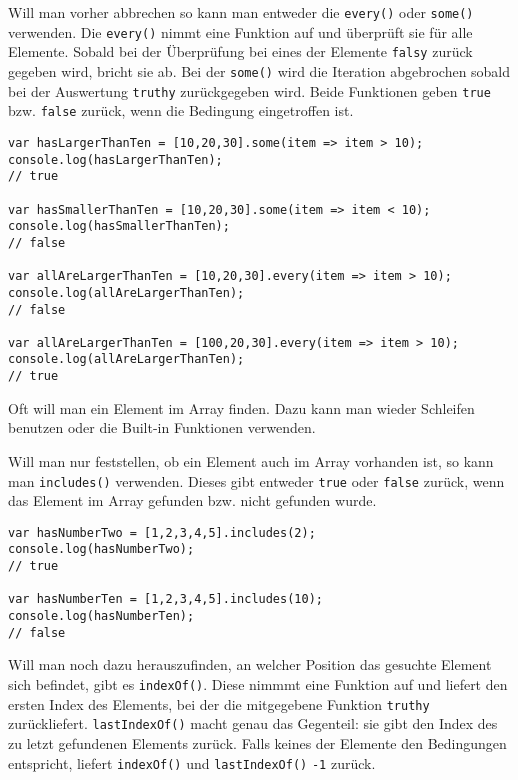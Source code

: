 \documentclass{book}
\begin{document}
Will man vorher abbrechen so kann man entweder die \lstinline|every()| oder \lstinline|some()| verwenden. Die \lstinline|every()| nimmt eine Funktion auf und überprüft sie für alle Elemente. Sobald bei der Überprüfung bei eines der Elemente \lstinline|falsy| zurück gegeben wird, bricht sie ab. Bei der \lstinline|some()| wird die Iteration abgebrochen sobald bei der Auswertung \lstinline|truthy| zurückgegeben wird. Beide Funktionen geben \lstinline|true| bzw. \lstinline|false| zurück, wenn die Bedingung eingetroffen ist.

\begin{lstlisting}[caption=Array Konstruktor]
var hasLargerThanTen = [10,20,30].some(item => item > 10);
console.log(hasLargerThanTen);
// true

var hasSmallerThanTen = [10,20,30].some(item => item < 10);
console.log(hasSmallerThanTen);
// false

var allAreLargerThanTen = [10,20,30].every(item => item > 10);
console.log(allAreLargerThanTen);
// false

var allAreLargerThanTen = [100,20,30].every(item => item > 10);
console.log(allAreLargerThanTen);
// true
\end{lstlisting}

Oft will man ein Element im Array finden. Dazu kann man wieder Schleifen benutzen oder die Built-in Funktionen verwenden. 

Will man nur feststellen, ob ein Element auch im Array vorhanden ist, so kann man \lstinline|includes()| verwenden. Dieses gibt entweder \lstinline|true| oder \lstinline|false| zurück, wenn das Element im Array gefunden bzw. nicht gefunden wurde.

\begin{lstlisting}[caption=Array Konstruktor]
var hasNumberTwo = [1,2,3,4,5].includes(2);
console.log(hasNumberTwo);
// true

var hasNumberTen = [1,2,3,4,5].includes(10);
console.log(hasNumberTen);
// false
\end{lstlisting}

Will man noch dazu herauszufinden, an welcher Position das gesuchte Element sich befindet, gibt es \lstinline|indexOf()|. Diese nimmmt eine Funktion auf und liefert den ersten Index des Elements, bei der die mitgegebene Funktion \lstinline|truthy| zurückliefert. \lstinline|lastIndexOf()| macht genau das Gegenteil: sie gibt den Index des zu letzt gefundenen Elements zurück. Falls keines der Elemente den Bedingungen entspricht, liefert \lstinline|indexOf()| und \lstinline|lastIndexOf()| \lstinline|-1| zurück.
\end{document}
